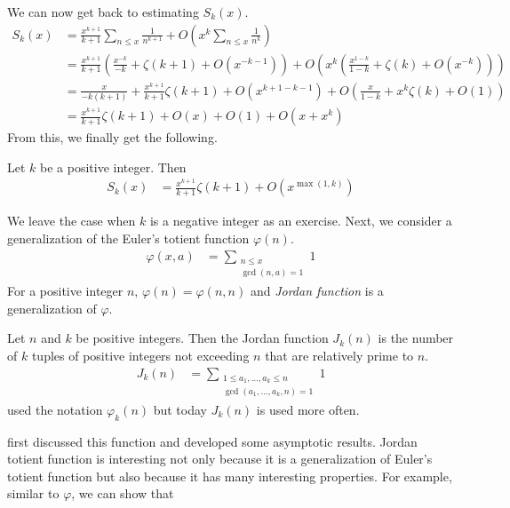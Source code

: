 \documentclass[elemannt.tex]{subfile}
\begin{document}
	We can now get back to estimating $S_{k}(x)$.
		\begin{align*}
			S_{k}(x)
				& = \frac{x^{k+1}}{k+1}\sum_{n\leq x}\frac{1}{n^{k+1}}+O\left(x^{k}\sum_{n\leq x}\frac{1}{n^{k}}\right)\\
				& = \frac{x^{k+1}}{k+1}\left(\frac{x^{-k}}{-k}+\zeta(k+1)+O(x^{-k-1})\right)+O\left(x^{k}\left(\frac{x^{1-k}}{1-k}+\zeta(k)+O(x^{-k})\right)\right)\\
				& = \frac{x}{-k(k+1)}+\frac{x^{k+1}}{k+1}\zeta(k+1)+O(x^{k+1-k-1})+O\left(\frac{x}{1-k}+x^{k}\zeta(k)+O(1)\right)\\
				& = \frac{x^{k+1}}{k+1}\zeta(k+1)+O(x)+O(1)+O(x+x^{k})
		\end{align*}
	From this, we finally get the following.
		\begin{theorem}
			Let $k$ be a positive integer. Then
				\begin{align*}
					S_{k}(x)
						& = \frac{x^{k+1}}{k+1}\zeta(k+1)+O(x^{\max(1,k)})
				\end{align*}
		\end{theorem}
	We leave the case when $k$ is a negative integer as an exercise. Next, we consider a generalization of the Euler's totient function $\varphi(n)$.
		\begin{align*}
			\varphi(x,a)
				& = \sum_{\substack{n\leq x\\\gcd(n,a)=1}}1
		\end{align*}
	For a positive integer $n$, $\varphi(n)=\varphi(n,n)$ and \textit{Jordan function} is a generalization of $\varphi$.
		\begin{definition}
			Let $n$ and $k$ be positive integers. Then the Jordan function $J_{k}(n)$ is the number of $k$ tuples of positive integers not exceeding $n$ that are relatively prime to $n$.
				\begin{align*}
					J_{k}(n)
						& = \sum_{\substack{1\leq a_{1},\ldots,a_{k}\leq n\\\gcd(a_{1},\ldots,a_{k},n)=1}}1
				\end{align*}
			\textcite{lehmer_1900} used the notation $\varphi_{k}(n)$ but today $J_{k}(n)$ is used more often.
		\end{definition}
	\textcite[Page $95-97$]{jordan_1989} first discussed this function and \textcite{lehmer_1900} developed some asymptotic results. Jordan totient function is interesting not only because it is a generalization of Euler's totient function but also because it has many interesting properties.
	For example, similar to $\varphi$, we can show that
\end{document}
